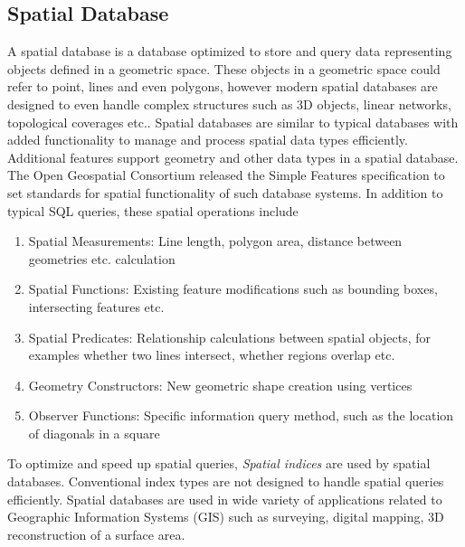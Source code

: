 \subsection{Spatial Database}
A spatial database \cite{bedard2007multiple} is a database optimized to store and query data representing objects defined in a geometric space. These objects in a geometric space could refer to point, lines and even polygons, however modern spatial databases are designed to even handle complex structures such as 3D objects, linear networks, topological coverages etc.. Spatial databases are similar to typical databases with added functionality to manage and process spatial data types efficiently. Additional features support geometry and other data types in a spatial database. The Open Geospatial Consortium \cite{lupp2008open} released the Simple Features specification \cite{isosfa} to set standards for spatial functionality of such database systems. In addition to typical SQL queries, these spatial operations include \begin{enumerate}
\item Spatial Measurements: Line length, polygon area, distance between geometries etc. calculation
\item Spatial Functions: Existing feature modifications such as bounding boxes, intersecting features etc.
\item Spatial Predicates: Relationship calculations between spatial objects, for examples whether two lines intersect, whether regions overlap etc.
\item Geometry Constructors: New geometric shape creation using vertices
\item Observer Functions: Specific information query method, such as the location of diagonals in a square
\end{enumerate}
To optimize and speed up spatial queries, \textit{Spatial indices} are used by spatial databases. Conventional index types are not designed to handle spatial queries efficiently. %
Spatial databases are used in wide variety of applications related to Geographic Information Systems (GIS) such as surveying, digital mapping, 3D reconstruction of a surface area. 
